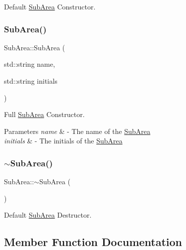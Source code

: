 Default \hyperlink{classSubArea}{Sub\+Area} Constructor. 

\mbox{\label{classSubArea_a27e357e4c5765eb3128fdde5cdf690e3}} 
\subsubsection{\texorpdfstring{Sub\+Area()}{SubArea()}\hspace{0.1cm}{\footnotesize\ttfamily [2/2]}}
{\footnotesize\ttfamily Sub\+Area\+::\+Sub\+Area (\begin{DoxyParamCaption}\item[{std\+::string}]{name,  }\item[{std\+::string}]{initials }\end{DoxyParamCaption})}



Full \hyperlink{classSubArea}{Sub\+Area} Constructor. 


\begin{DoxyParams}{Parameters}
{\em name} & -\/ The name of the \hyperlink{classSubArea}{Sub\+Area} \\
\hline
{\em initials} & -\/ The initials of the \hyperlink{classSubArea}{Sub\+Area} \\
\hline
\end{DoxyParams}
\mbox{\label{classSubArea_a0423d8d6d9f297cc1ceff557279d9be8}} 
\subsubsection{\texorpdfstring{$\sim$\+Sub\+Area()}{~SubArea()}}
{\footnotesize\ttfamily Sub\+Area\+::$\sim$\+Sub\+Area (\begin{DoxyParamCaption}{ }\end{DoxyParamCaption})\hspace{0.3cm}{\ttfamily [virtual]}}



Default \hyperlink{classSubArea}{Sub\+Area} Destructor. 



\subsection{Member Function Documentation}
\mbox{\label{classSubArea_a0385787547e85f2481bc0031e6c98f10}} 
